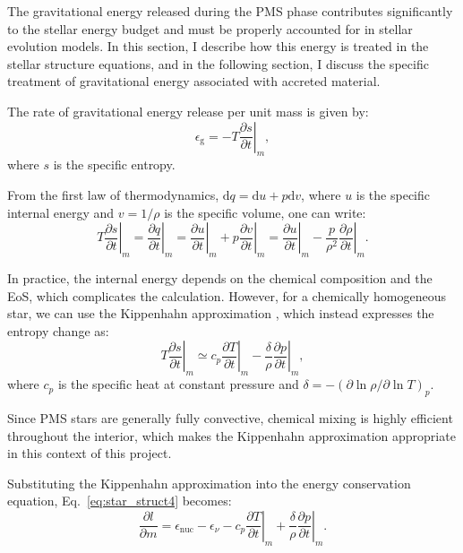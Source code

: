 \documentclass[12pt,a4paper]{article}
\newcommand{\mr}{\mathrm}
\newcommand{\pfird}[2][]{\frac{\partial#1}{\partial#2}}
\newcommand{\dd}[1]{\mathrm{d}#1}
\begin{document}
The gravitational energy released during the PMS phase contributes significantly to the stellar energy budget and must be properly accounted for in stellar evolution models. In this section, I describe how this energy is treated in the stellar structure equations, and in the following section, I discuss the specific treatment of gravitational energy associated with accreted material.

The rate of gravitational energy release per unit mass is given by:
\begin{equation}
  \epsilon_\mr{g} = -T\left.\pfird[s]{t}\right|_m, \label{eq:grav_energy}
\end{equation}
where $s$ is the specific entropy.

From the first law of thermodynamics, $\dd{q} = \dd{u} + p\dd{v}$, where $u$ is the specific internal energy and $v = 1/\rho$ is the specific volume, one can write:
\begin{equation}
  T\left.\pfird[s]{t}\right|_m = \left.\pfird[q]{t}\right|_m = \left.\pfird[u]{t}\right|_m + p\left.\pfird[v]{t}\right|_m = \left.\pfird[u]{t}\right|_m - \frac{p}{\rho^2}\left.\pfird[\rho]{t}\right|_m.
\end{equation}

In practice, the internal energy depends on the chemical composition and the EoS, which complicates the calculation. However, for a chemically homogeneous star, we can use the Kippenhahn approximation \parencite{KippenhahnEtAl2013}, which instead expresses the entropy change as:
\begin{equation}
  T\left.\pfird[s]{t}\right|_m \simeq c_p\left.\pfird[T]{t}\right|_m - \frac{\delta}{\rho}\left.\pfird[p]{t}\right|_m, \label{eq:grav_energy_kipp}
\end{equation}
where $c_p$ is the specific heat at constant pressure and $\delta = -\left(\partial \ln \rho / \partial \ln T\right)_p$. 

Since PMS stars are generally fully convective, chemical mixing is highly efficient throughout the interior, which makes the Kippenhahn approximation appropriate in this context of this project.

Substituting the Kippenhahn approximation into the energy conservation equation, Eq.~\eqref{eq:star_struct4} becomes:
\begin{equation}
  \pfird[l]{m} = \epsilon_\mr{nuc} - \epsilon_\nu - \left.c_p\pfird[T]{t}\right|_m + \frac{\delta}{\rho}\left.\pfird[p]{t}\right|_m. \label{eq:star_struct4_kipp}
\end{equation}
\end{document}
